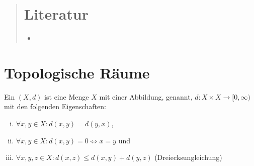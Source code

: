 
\newcommand{\fach}{Grundlagen der Analysis, Topologie, Geometrie}
\newcommand{\shortFach}{Analysis, Topologie, Geometrie}
\newcommand{\semester}{SoSe 2014}
\newcommand{\homepage}{https://wwwmath.uni-muenster.de/reine/u/topos/lehre/SS2014/AnaTopGeo/anatopgeo.html}

\newcommand{\prof}{Prof.\ Dr.\ Arthur Bartels}
\publishers{}




\maketitle
\begin{abstract}


\section*{Literatur}
\begin{itemize}[itemsep=0pt]
	\item {} \textcite{Bred}
\end{itemize}
\end{abstract}

\tableofcontents
\cleardoubleoddemptypage

\setcounter{page}{1}
\setcounter{footnote}{0}

\section{Topologische Räume} %
\label{sec:top_raume}

\begin{definition}[label=def:metrischer,{name=[metrischer Raum]}]
	Ein  $(X,d)$ ist eine Menge $X$ mit einer Abbildung,  genannt,  $d \colon X \times X \to [0,\infty)$ mit den folgenden Eigenschaften:
	\begin{enumerate}[(i)]
		\item $\forall x,y \in X : d(x,y) = d(y,x)$,
		\item $\forall x,y \in X : d(x,y)=0 \iff x=y$ und
		\item $\forall x,y,z \in X : d(x,z) \le d(x,y) + d(y,z)$  (Dreiecksungleichung)
	\end{enumerate}
\end{definition}

